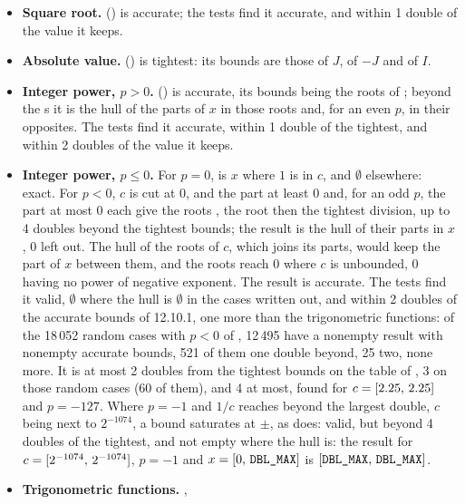 \documentclass[12pt,a4paper,twoside,openright]{book}
\begin{document}
\begin{itemize}
\item[$\bullet$] \textbf{Square root.} 
  () is accurate; the tests find it accurate, and within 1
  double of the value it keeps.
\item[$\bullet$] \textbf{Absolute value.} 
  () is tightest: its bounds are those of $J$, of $-J$ and of
  $I$.
\item[$\bullet$] \textbf{Integer power, $p>0$.}
   () is accurate, its bounds
  being the roots of ; beyond the s it
  is the hull of the parts of $x$ in those roots and, for an even $p$, in
  their opposites.\newinvfive{} The tests find it accurate, within 1 double
  of the tightest, and within 2 doubles of the value it keeps.
\item[$\bullet$] \textbf{Integer power, $p\leq0$.}\newinvfive{} For $p=0$,
   is $x$ where $1$ is in $c$, and
  $\emptyset$ elsewhere: exact. For $p<0$, $c$ is cut at $0$, and the part
  at least $0$ and, for an odd $p$, the part at most $0$ each give the
  roots , the root then the tightest division, up
  to 4 doubles beyond the tightest bounds; the result is the hull of their
  parts in $x$, $0$ left out. The hull of the roots of $c$, which joins its
  parts, would keep the part of $x$ between them, and the roots reach $0$
  where $c$ is unbounded, $0$ having no power of negative exponent. The
  result is accurate. The tests find it valid, $\emptyset$ where the hull
  is $\emptyset$ in the cases written out, and within 2 doubles of the
  accurate bounds of 12.10.1, one more than the trigonometric functions:
  of the 18\,052 random cases with $p<0$ of
  , 12\,495 have a nonempty result with
  nonempty accurate bounds, 521 of them one double beyond, 25 two, none
  more. It is at most 2 doubles from the tightest bounds on the table of
  , 3 on those random cases (60 of them), and 4 at
  most, found for $c=[2.25,\,2.25]$ and $p=-127$. Where $p=-1$ and
  $1/c$ reaches beyond the largest double, $c$ being next to $2^{-1074}$, a
  bound saturates at $\pm$, as  does: valid,
  but beyond 4 doubles of the tightest, and not empty where the hull is:
  the result for $c=[2^{-1074},\,2^{-1074}]$, $p=-1$ and
  $x=[0,\,\texttt{DBL\_MAX}]$ is $[\texttt{DBL\_MAX},\,\texttt{DBL\_MAX}]$.
\item[$\bullet$] \textbf{Trigonometric functions.} ,

\end{itemize}
\end{document}
